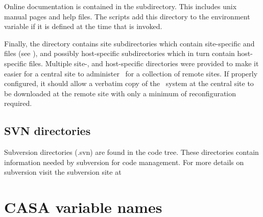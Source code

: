 Online documentation is contained in the  subdirectory.  This
includes unix manual pages and help files.  The  scripts add
this directory to the  environment variable if it is defined at
the time that  is invoked.

Finally, the  directory contains site subdirectories which
contain site-specific  and  files (see
), and possibly host-specific subdirectories which
in turn contain host-specific  files.  Multiple site-, and
host-specific directories were provided to make it easier for a central site
to administer \casa\ for a collection of remote sites.  If properly
configured, it should allow a verbatim copy of the \casa\ system at the
central site to be downloaded at the remote site with only a minimum of
reconfiguration required.


\subsection{SVN directories}
\label{svn directories}

Subversion directories (.svn) are found in the code tree. These directories
contain information needed by subversion for code management. For more details
on subversion visit the subversion site at


\section{CASA variable names}
\label{variables}
 
